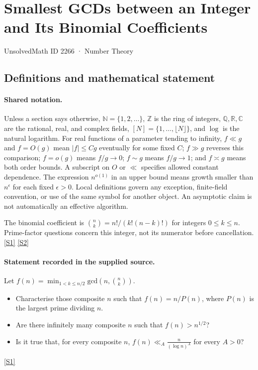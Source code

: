 \documentclass[11pt,a4paper]{article}
\newcommand{\N}{\mathbb{N}}
\newcommand{\Z}{\mathbb{Z}}
\newcommand{\Q}{\mathbb{Q}}
\newcommand{\R}{\mathbb{R}}
\newcommand{\C}{\mathbb{C}}
\newcommand{\sref}[2]{\hyperlink{source:#1:#2}{[S#2]}}
\begin{document}

\setcounter{section}{2265}

\section{Smallest GCDs between an Integer and Its Binomial Coefficients}\label{2266}

{\small\sffamily UnsolvedMath ID 2266 · Number Theory}

\subsection{Definitions and mathematical statement}

\paragraph{Shared notation.}Unless a section says otherwise, $\N=\{1,2,\ldots\}$,
$\Z$ is the ring of integers, $\Q,\R,\C$ are the rational, real, and complex
fields, $[N]=\{1,\ldots,\lfloor N\rfloor\}$, and $\log$ is the natural
logarithm. For real functions of a parameter tending to infinity,
$f\ll g$ and $f=O(g)$ mean $|f|\leq Cg$ eventually for some fixed $C$;
$f\gg g$ reverses this comparison; $f=o(g)$ means $f/g\to0$;
$f\sim g$ means $f/g\to1$; and $f\asymp g$ means both order bounds.
A subscript on $O$ or $\ll$ specifies allowed constant dependence.
The expression $n^{o(1)}$ in an upper bound means growth smaller than
$n^\epsilon$ for each fixed $\epsilon>0$. Local definitions govern any
exception, finite-field convention, or use of the same symbol for another
object. An asymptotic claim is not automatically an effective algorithm.



The binomial coefficient is $\binom nk=n!/(k!(n-k)!)$ for integers $0\leq k\leq n$. Prime-factor questions concern this integer, not its numerator before cancellation. \sref{2266}{1} \sref{2266}{2}

\paragraph{Statement recorded in the supplied source.}
Let $ f(n)=\min_{1<k\leq n/2}\textrm{gcd}\left(n,\binom{n}{k}\right). $ \begin{itemize}
\item Characterise those composite $n$ such that $f(n)=n/P(n)$, where $P(n)$ is the largest prime dividing $n$.
\item Are there infinitely many composite $n$ such that $f(n)>n^{1/2}$?
\item  Is it true that, for every composite $n$, $ f(n) \ll_A \frac{n}{(\log n)^A} $ for every $A>0$?
\end{itemize} \sref{2266}{1}
\end{document}

